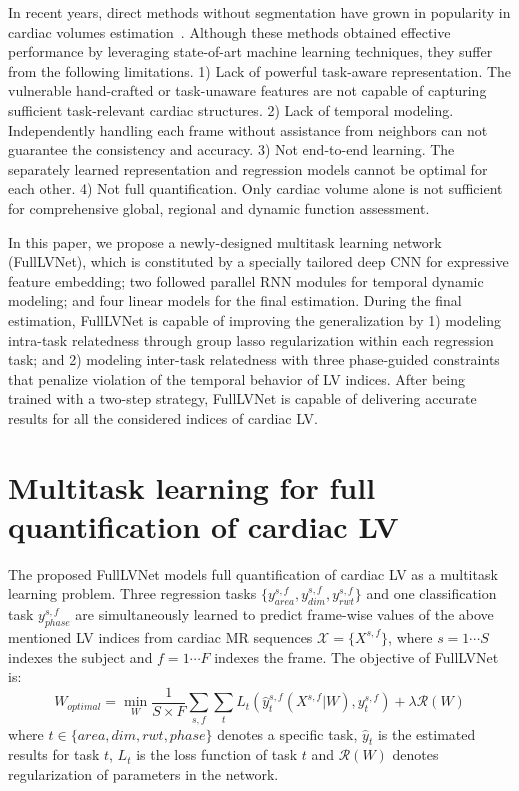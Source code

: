 \documentclass{llncs}
\begin{document}
In recent years, direct methods without segmentation have grown in popularity in cardiac volumes estimation~\cite{afshin2012global,afshin2014regional,wang2014direct,zhen2015direct,zhen2014direct,zhen2015multi,zhen2017direct}.
Although these methods obtained effective performance by leveraging state-of-art machine learning techniques, they suffer from the following limitations. 
1) Lack of powerful task-aware representation. The vulnerable hand-crafted or task-unaware features are not capable of capturing sufficient task-relevant cardiac structures. 
2) Lack of temporal modeling. Independently handling each frame without assistance from neighbors can not guarantee the consistency and accuracy. 
3) Not end-to-end learning. The separately learned representation and regression models cannot be optimal for each other.
4) Not full quantification. Only cardiac volume alone is not sufficient for comprehensive global, regional and dynamic function assessment. 

In this paper, we propose a newly-designed multitask learning network (FullLVNet), which is constituted by a specially tailored deep CNN for expressive feature embedding; two followed parallel RNN modules for temporal dynamic modeling; and four linear models for the final estimation. During the final estimation, FullLVNet is capable of improving the generalization by 1) modeling intra-task relatedness through group lasso regularization within each regression task; and 2) modeling inter-task relatedness with three phase-guided constraints that penalize violation of the temporal behavior of LV indices. After being trained with a two-step strategy, FullLVNet is capable of delivering accurate results for all the considered indices of cardiac LV.


\section{Multitask learning for full quantification of cardiac LV}

The proposed FullLVNet models full quantification of cardiac LV as a multitask learning problem. Three regression tasks $\{y_{area}^{s,f}, y_{dim}^{s,f}, y_{rwt}^{s,f}\}$ and one classification task $y_{phase}^{s,f}$ are simultaneously learned to predict frame-wise values of the above mentioned LV indices from cardiac MR sequences $\mathcal{X}=\{X^{s,f}\}$, where $s=1\cdots S$ indexes the subject and $f=1\cdots F$ indexes the frame. 
The objective of FullLVNet is:
\begin{equation}\label{eq_objective}
W_{optimal}=\min_{W}\frac{1}{S\times F}\sum_{s,f}\sum_{t}L_t(\hat{y}_t^{s,f}(X^{s,f}|W),y_t^{s,f})+\lambda \mathcal{R}(W)
\end{equation}
where $t\in \{area, dim, rwt, phase\}$ denotes a specific task, $\hat{y}_t$ is the estimated results for task $t$, $L_t$ is the loss function of task $t$ and $\mathcal{R}(W)$ denotes regularization of parameters in the network.
\end{document}
